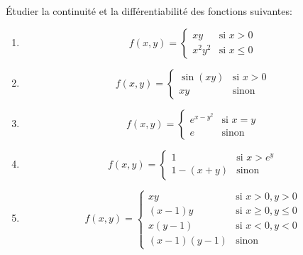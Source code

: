 
\begin{exercice}\label{exo0044}

Étudier la continuité et la différentiabilité des fonctions suivantes:
\begin{enumerate}
	\item
	\begin{equation}
		f(x,y)=
			\begin{cases}
				xy	&	\text{si }x>0\\
				x^2y^2	&	 \text{si }x\leq 0
			\end{cases}
	\end{equation}

	\item		\label{Item0044b}
	\begin{equation}
		f(x,y)=
			\begin{cases}
				\sin(xy)	&	\text{si }x>0\\
				xy	&	 \text{sinon}
			\end{cases}
	\end{equation}
	\item
	\begin{equation}
		f(x,y)=
			\begin{cases}
				 e^{x-y^2}	&	\text{si }x=y\\
				e	&	 \text{sinon}
			\end{cases}
	\end{equation}
	\item
	\begin{equation}
		f(x,y)=
			\begin{cases}
				1	&	\text{si }x>e^y\\
				1-(x+y)	&	 \text{sinon}
			\end{cases}
	\end{equation}
	\item
	\begin{equation}
		f(x,y)=
			\begin{cases}
				xy	&	\text{si }x>0,y>0\\
				(x-1)y	&	 \text{si }x\geq 0,y\leq 0\\
				x(y-1)	&	 \text{si }x<0,y<0\\
				(x-1)(y-1)	&	 \text{sinon}
			\end{cases}
	\end{equation}
\end{enumerate}

\end{exercice}
